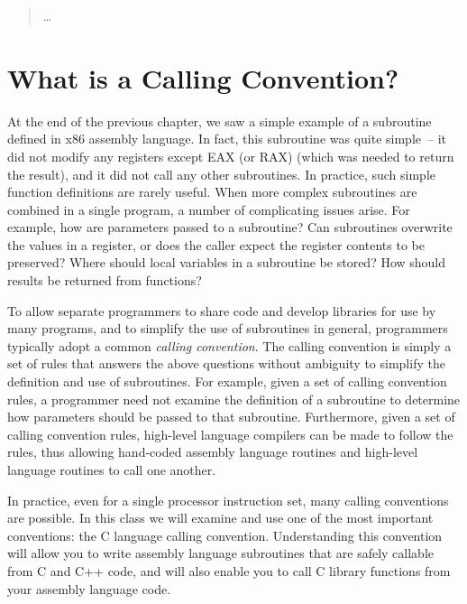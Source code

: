 \begin{quotation}
\ldots
\end{quotation}


\section{What is a Calling Convention?}

At the end of the previous chapter, we saw a simple example of a
subroutine defined in x86 assembly language. In fact, this subroutine
was quite simple~-- it did not modify any registers except EAX (or
RAX) (which was needed to return the result), and it did not call any
other subroutines. In practice, such simple function definitions are
rarely useful. When more complex subroutines are combined in a single
program, a number of complicating issues arise.  For example, how are
parameters passed to a subroutine? Can subroutines overwrite the
values in a register, or does the caller expect the register contents
to be preserved? Where should local variables in a subroutine be
stored? How should results be returned from functions?

To allow separate programmers to share code and develop libraries for
use by many programs, and to simplify the use of subroutines in
general, programmers typically adopt a common {\em calling
  convention}. The calling convention is simply a set of rules that
answers the above questions without ambiguity to simplify the
definition and use of subroutines. For example, given a set of calling
convention rules, a programmer need not examine the definition of a
subroutine to determine how parameters should be passed to that
subroutine. Furthermore, given a set of calling convention rules,
high-level language compilers can be made to follow the rules, thus
allowing hand-coded assembly language routines and high-level language
routines to call one another.

In practice, even for a single processor instruction set, many calling
conventions are possible.  In this class we will examine and use one
of the most important conventions: the C language calling convention.
Understanding this convention will allow you to write assembly
language subroutines that are safely callable from C and C++ code, and
will also enable you to call C library functions from your assembly
language code.


